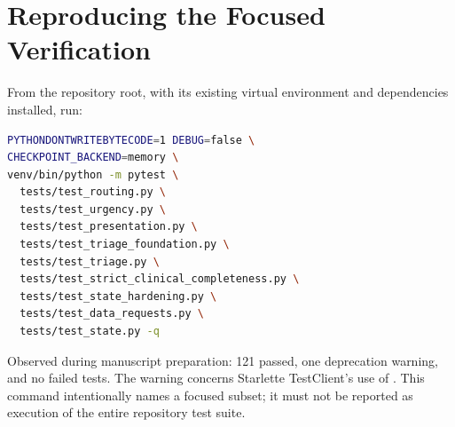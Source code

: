 \documentclass[conference]{IEEEtran}
\newcommand{\code}[1]{\texttt{\detokenize{#1}}}
\begin{document}
\appendices
\section{Reproducing the Focused Verification}
From the repository root, with its existing virtual environment and dependencies installed, run:
\begin{lstlisting}[language=bash]
PYTHONDONTWRITEBYTECODE=1 DEBUG=false \
CHECKPOINT_BACKEND=memory \
venv/bin/python -m pytest \
  tests/test_routing.py \
  tests/test_urgency.py \
  tests/test_presentation.py \
  tests/test_triage_foundation.py \
  tests/test_triage.py \
  tests/test_strict_clinical_completeness.py \
  tests/test_state_hardening.py \
  tests/test_data_requests.py \
  tests/test_state.py -q
\end{lstlisting}
Observed during manuscript preparation: 121 passed, one deprecation warning, and no failed tests. The warning concerns Starlette TestClient's use of \code{httpx}. This command intentionally names a focused subset; it must not be reported as execution of the entire repository test suite.
\end{document}
